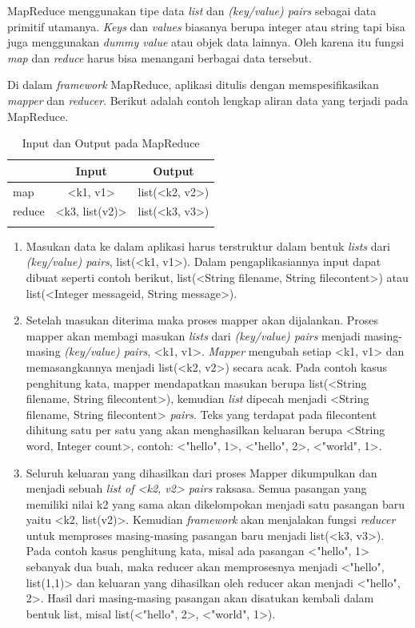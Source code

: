 MapReduce menggunakan tipe data \textit{list} dan \textit{(key/value) pairs} sebagai data primitif utamanya. \textit{Keys} dan \textit{values} biasanya berupa integer atau string tapi bisa juga menggunakan \textit{dummy value} atau objek data lainnya. Oleh karena itu fungsi \textit{map} dan \textit{reduce} harus bisa menangani berbagai data tersebut.

Di dalam \textit{framework} MapReduce, aplikasi ditulis dengan memspesifikasikan \textit{mapper} dan \textit{reducer}. Berikut adalah contoh lengkap aliran data yang terjadi pada MapReduce.

\begin{table}
	\centering
	\begin{tabular}{l | c | c}
		 & Input & Output \\
	 	\hline
		map & <k1, v1> & list(<k2, v2>) \\
		reduce & <k3, list(v2)> & list(<k3, v3>) \\ 
		\label{tab:mapreduce_process}
	\end{tabular}	
	\caption{Input dan Output pada MapReduce}
\end{table}	

\begin{enumerate}
	\item Masukan data ke dalam aplikasi harus terstruktur dalam bentuk \textit{lists} dari \textit{(key/value) pairs}, list(<k1, v1>). Dalam pengaplikasiannya input dapat dibuat seperti contoh berikut, list(<String filename, String filecontent>) atau list(<Integer messageid, String message>).
	\item Setelah masukan diterima maka proses mapper akan dijalankan. Proses mapper akan membagi masukan \textit{lists} dari \textit{(key/value) pairs} menjadi masing-masing \textit{(key/value) pairs}, <k1, v1>. \textit{Mapper} mengubah setiap <k1, v1> dan memasangkannya menjadi list(<k2, v2>) secara acak. Pada contoh kasus penghitung kata, mapper mendapatkan masukan berupa list(<String filename, String filecontent>), kemudian \textit{list} dipecah menjadi <String filename, String filecontent> \textit{pairs}. Teks yang terdapat pada filecontent dihitung satu per satu yang akan menghasilkan keluaran berupa <String word, Integer count>, contoh: <"hello", 1>, <"hello", 2>, <"world", 1>. 
	\item Seluruh keluaran yang dihasilkan dari proses Mapper dikumpulkan dan menjadi sebuah \textit{list of <k2, v2> pairs} raksasa. Semua pasangan yang memiliki nilai k2 yang sama akan dikelompokan menjadi satu pasangan baru yaitu <k2, list(v2)>. Kemudian \textit{framework} akan menjalakan fungsi \textit{reducer} untuk memproses masing-masing pasangan baru menjadi list(<k3, v3>). Pada contoh kasus penghitung kata, misal ada pasangan <"hello", 1> sebanyak dua buah, maka reducer akan memprosesnya menjadi <"hello", list(1,1)> dan keluaran yang dihasilkan oleh reducer akan menjadi <"hello", 2>. Hasil dari masing-masing pasangan akan disatukan kembali dalam bentuk list, misal list(<"hello", 2>, <"world", 1>).
\end{enumerate} 

